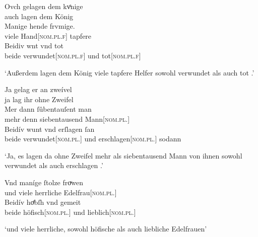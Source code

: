 \begin{exe}
\begin{xlist}
	\ex \label{ex:konjadjvvbeidiu_4} %
		\gll Ovch gelagen dem kvͤnige \\
			auch lagen dem König \\
	\sn \gll Manige hende frvmige. \\
			viele Hand[\textsc{nom.pl.f\subM}] tapfere \\
	\sn \gll Beidiv wnt vnd tot \\
			beide verwundet[\textsc{nom.pl.f\subM}] und
			tot[\textsc{nom.pl.f\subM}] \\
		\begin{taggedline}{\parencites[\pno~150ra,20--22]{kc:VB}[vgl.][15880--15882]{schroeder1895}}
		\trans `Außerdem lagen dem König viele tapfere Helfer
			sowohl verwundet als auch tot .'
		\end{taggedline}

	\ex \label{ex:konjadjvvbeidiu_5} %
		\gll Ja gelag er an zweível \\
			ja lag ihr ohne Zweifel \\
	\sn \gll Mer dann ſûbentauſent man \\
			mehr denn siebentausend Mann[\textsc{nom.pl.\MascM}] \\
	\sn \gll Beidív wunt vnd erſlagen ſan \\
			beide verwundet[\textsc{nom.pl.\MascM}] und
			erschlagen[\textsc{nom.pl.\MascM}] sodann \\
		\begin{taggedline}{\parencites[\pno~45va,46--48]{kc:B1}[vgl.][16891--16893]{schroeder1895}}
		\trans `Ja, es lagen da ohne Zweifel mehr als siebentausend Mann
		von ihnen sowohl verwundet als auch erschlagen .'
		\end{taggedline}

	\ex \label{ex:konjadjvvbeidiu_6} %
		\gll Vnd maníge ſtolze froͮwen \\
			und viele herrliche Edelfrau[\textsc{nom.pl.\FemF}] \\
	\sn \gll Beidív hoͤbſh vnd gemeit \\
			beide höfisch[\textsc{nom.pl.\FemF}] und lieblich[\textsc{nom.pl.\FemF}] \\
		\begin{taggedline}{\parencites[\pno~21va,21--22]{kc:VB}[zu][4351--4352]{schroeder1895}}
		\trans `und viele herrliche, sowohl höfische als auch
			liebliche Edelfrauen'
		\end{taggedline}
	\end{xlist}
\end{exe}

